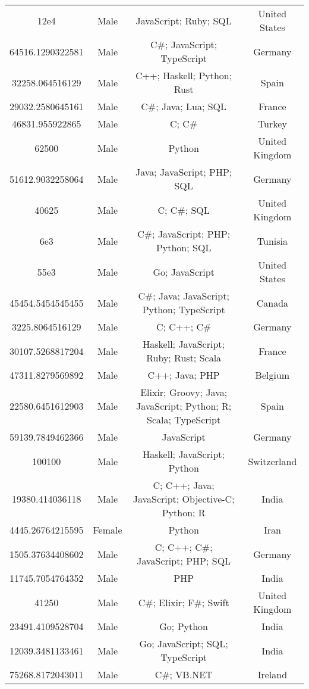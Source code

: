 \begin{center}
\begin{tabular}{ |c|c|c|c| }
12e4  &  Male  &  JavaScript; Ruby; SQL  &  United States  \\ 
64516.1290322581  &  Male  &  C\#; JavaScript; TypeScript  &  Germany  \\ 
32258.064516129  &  Male  &  C++; Haskell; Python; Rust  &  Spain  \\ 
29032.2580645161  &  Male  &  C\#; Java; Lua; SQL  &  France  \\ 
46831.955922865  &  Male  &  C; C\#  &  Turkey  \\ 
62500  &  Male  &  Python  &  United Kingdom  \\ 
51612.9032258064  &  Male  &  Java; JavaScript; PHP; SQL  &  Germany  \\ 
40625  &  Male  &  C; C\#; SQL  &  United Kingdom  \\ 
6e3  &  Male  &  C\#; JavaScript; PHP; Python; SQL  &  Tunisia  \\ 
55e3  &  Male  &  Go; JavaScript  &  United States  \\ 
45454.5454545455  &  Male  &  C\#; Java; JavaScript; Python; TypeScript  &  Canada  \\ 
3225.8064516129  &  Male  &  C; C++; C\#  &  Germany  \\ 
30107.5268817204  &  Male  &  Haskell; JavaScript; Ruby; Rust; Scala  &  France  \\ 
47311.8279569892  &  Male  &  C++; Java; PHP  &  Belgium  \\ 
22580.6451612903  &  Male  &  Elixir; Groovy; Java; JavaScript; Python; R; Scala; TypeScript  &  Spain  \\ 
59139.7849462366  &  Male  &  JavaScript  &  Germany  \\ 
100100  &  Male  &  Haskell; JavaScript; Python  &  Switzerland  \\ 
19380.414036118  &  Male  &  C; C++; Java; JavaScript; Objective-C; Python; R  &  India  \\ 
4445.26764215595  &  Female  &  Python  &  Iran  \\ 
1505.37634408602  &  Male  &  C; C++; C\#; JavaScript; PHP; SQL  &  Germany  \\ 
11745.7054764352  &  Male  &  PHP  &  India  \\ 
41250  &  Male  &  C\#; Elixir; F\#; Swift  &  United Kingdom  \\ 
23491.4109528704  &  Male  &  Go; Python  &  India  \\ 
12039.3481133461  &  Male  &  Go; JavaScript; SQL; TypeScript  &  India  \\ 
75268.8172043011  &  Male  &  C\#; VB.NET  &  Ireland  \\ 

\end{tabular}
\end{center}
